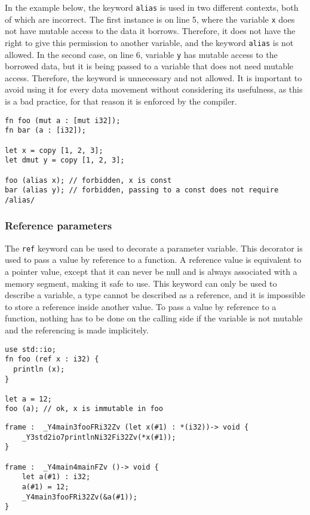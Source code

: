 In the example below, the keyword \texttt{alias} is used in two different
contexts, both of which are incorrect. The first instance is on line 5, where
the variable \texttt{x} does not have mutable access to the data it borrows.
Therefore, it does not have the right to give this permission to another
variable, and the keyword \texttt{alias} is not allowed. In the second case, on
line 6, variable \texttt{y} has mutable access to the borrowed data, but it is
being passed to a variable that does not need mutable access. Therefore, the
keyword is unnecessary and not allowed. It is important to avoid using it for
every data movement without considering its usefulness, as this is a bad
practice, for that reason it is enforced by the compiler.

\begin{lstlisting}[style=coloredverbatim]
fn foo (mut a : [mut i32]);
fn bar (a : [i32]);

let x = copy [1, 2, 3];
let dmut y = copy [1, 2, 3];

foo (alias x); // forbidden, x is const
bar (alias y); // forbidden, passing to a const does not require /alias/
\end{lstlisting}

\subsubsection {Reference parameters}
\label{sec:ref_param}


The \texttt{ref} keyword can be used to decorate a parameter variable. This
decorator is used to pass a value by reference to a function. A reference value
is equivalent to a pointer value, except that it can never be null and is always
associated with a memory segment, making it safe to use. This keyword can only
be used to describe a variable, a type cannot be described as a reference, and
it is impossible to store a reference inside another value. To pass a value by
reference to a function, nothing has to be done on the calling side if the
variable is not mutable and the referencing is made implicitely.

\begin{lstlisting}[style=coloredverbatim]
use std::io;
fn foo (ref x : i32) {
  println (x);
}

let a = 12;
foo (a); // ok, x is immutable in foo
\end{lstlisting}

\begin{lstlisting}[style=intermediateVerb]
frame :  _Y4main3fooFRi32Zv (let x(#1) : *(i32))-> void {
    _Y3std2io7printlnNi32Fi32Zv(*x(#1));
}

frame :  _Y4main4mainFZv ()-> void {
    let a(#1) : i32;
    a(#1) = 12;
    _Y4main3fooFRi32Zv(&a(#1));
}
\end{lstlisting}

